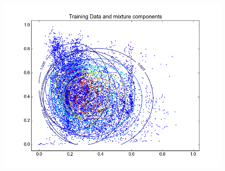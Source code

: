 \documentclass[11pt,a4paper]{article}
\begin{document}
\begin{minipage}[b]{0.25\textwidth}
\begin{figure}[H]
  \centering
  \includegraphics[width=.8\linewidth]{Figures/contours_diagforest30.png}

  \label{fig:sfig1}
\end{figure}%
\end{minipage}
\end{document}

